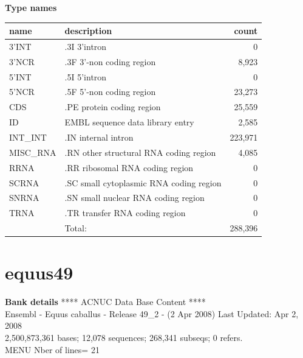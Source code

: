 \documentclass{article}
\begin{document}
\begin{Schunk}
\textbf{Type names}
\noindent\begin{tabular}{llr}
\hline \hline
name & description & count \\
\hline
3'INT  &  .3I 3'intron  &  0 \\
3'NCR  &  .3F  3'-non coding region  &  8,923 \\
5'INT  &  .5I 5'intron  &  0 \\
5'NCR  &  .5F  5'-non coding region  &  23,273 \\
CDS  &  .PE protein coding region  &  25,559 \\
ID  &  EMBL sequence data library entry  &  2,585 \\
INT\_INT  &  .IN  internal intron  &  223,971 \\
MISC\_RNA  &  .RN other structural RNA coding region  &  4,085 \\
RRNA  &  .RR ribosomal RNA coding region  &  0 \\
SCRNA  &  .SC small cytoplasmic RNA coding region  &  0 \\
SNRNA  &  .SN small nuclear RNA coding region  &  0 \\
TRNA  &  .TR transfer RNA coding region  &  0 \\
\hline
 & Total: & 288,396 \\
\hline \hline
\end{tabular}

\section{ equus49 }
\textbf{Bank details}
             ****     ACNUC Data Base Content      ****                         \\
Ensembl - Equus caballus - Release 49\_2 - (2 Apr 2008) Last Updated: Apr  2, 2008\\
2,500,873,361 bases; 12,078 sequences; 268,341 subseqs; 0 refers.\\
MENU Nber of lines= 21                                                         


\end{Schunk}
\end{document}
